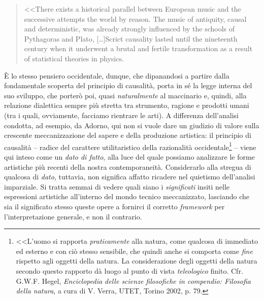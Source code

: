 \documentclass[a4paper,12pt]{scrartcl}
\newcommand{\omissis}{[\dots\unkern]}
\begin{document}
    \begin{quotation}
        \small{<<There exists a historical parallel between European music and the successive attempts the world by reason. The music of antiquity, causal and deterministic, was already strongly influenced by the schools of Pythagoras and Plato, \omissis Scrict causality lasted until the nineteenth century when it underwent a brutal and fertile transformation as a result of statistical theories in physics}.
    \end{quotation}

    È lo stesso pensiero occidentale, dunque, che dipanandosi a partire dalla fondamentale scoperta del principio di causalità, porta in sé la legge interna del suo sviluppo, che porterò poi, quasi \emph{naturalmente} al maccinario e, quindi, alla relazione dialettica sempre più stretta tra strumento, ragione e prodotti umani (tra i quali, ovviamente, facciamo rientrare le arti). A differenza dell'analisi condotta, ad esempio, da Adorno, qui non si vuole dare un giudizio di valore sulla crescente meccanizzazione del sapere e della produzione artistica: il principio di causalità -- radice del carattere utilitaristico della razionalità occidentale\footnote{<<L'uomo si rapporta \emph{praticamente} alla natura, come qualcosa di immediato ed esterno e con ciò stesso sensibile, che quindi anche si comporta come \emph{fine} rispetto agli oggetti della natura. La considerazione degli oggetti della natura secondo questo rapporto dà luogo al punto di vista \emph{teleologico} finito. Cfr. G.W.F. Hegel, \textit{Enciclopedia delle scienze filosofiche in compendio: Filosofia della natura}, a cura di V. Verra, UTET, Torino 2002, p. 79.} -- viene qui inteso come un \emph{dato di fatto}, alla luce del quale possiamo analizzare le forme artistiche più recenti della nostra contemporaneità. Considerarlo alla stregua di qualcosa di \emph{dato}, tuttavia, non significa affatto ricadere nel quietismo dell'analisi imparziale. Si tratta semmai di vedere quali siano i \emph{significati} insiti nelle espressioni artistiche all'interno del mondo tecnico meccanizzato, lasciando che sia il significato stesso queste opere a fornirci il corretto \emph{framework} per l'interpretazione generale, e non il contrario.
    
\end{document}
